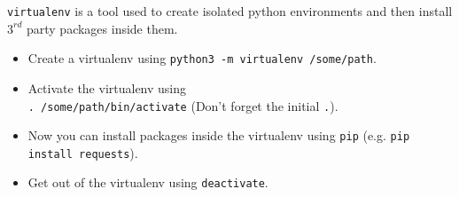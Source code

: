 \texttt{virtualenv} is a tool used to create isolated python
environments and then install $3^{rd}$ party packages inside them.

\begin{itemize}
\item Create a virtualenv using \texttt{python3 -m virtualenv
    /some/path}.
\item Activate the virtualenv using \\ \texttt{. /some/path/bin/activate}
  (Don't forget the initial \texttt{.}).
\item Now you can install packages inside the virtualenv using
  \texttt{pip} (e.g. \texttt{pip install requests}).
\item Get out of the virtualenv using \texttt{deactivate}.
\end{itemize}
